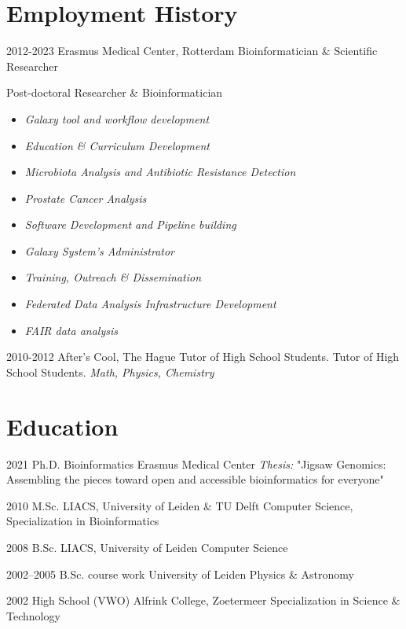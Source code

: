 \documentclass[]{shiltemann-cv}
\begin{document}
\section{Employment History}

\begin{entrylist}
 \entry
    {2012-2023}
    {Erasmus Medical Center, Rotterdam}
    {Bioinformatician \& Scientific Researcher}
    {Post-doctoral Researcher \& Bioinformatician
     \begin{itemize}
       \item \emph{Galaxy tool and workflow development}
       \item \emph{Education \& Curriculum Development}
       \item \emph{Microbiota Analysis and Antibiotic Resistance Detection}
       \item \emph{Prostate Cancer Analysis}
       \item \emph{Software Development and Pipeline building}
       \item \emph{Galaxy System's Administrator}
       \item \emph{Training, Outreach \& Dissemination}
       \item \emph{Federated Data Analysis Infrastructure Development}
       \item \emph{FAIR data analysis}
     \end{itemize}}
  \entry
    {2010-2012}
    {After's Cool, The Hague}
    {Tutor of High School Students.}
    {Tutor of High School Students. \emph{Math, Physics, Chemistry}}
\end{entrylist}


\section{Education}

\begin{entrylist}
  \entry
    {2021}
    {Ph.D. Bioinformatics}
    {Erasmus Medical Center}
    {\emph{Thesis:} "Jigsaw Genomics: Assembling the pieces toward open and accessible bioinformatics for everyone"}
\end{entrylist}
\begin{entrylist}


  \entry
    {2010}
    {M.Sc.}
    {LIACS, University of Leiden \& TU Delft}
    {Computer Science, Specialization in Bioinformatics}

\end{entrylist}
\begin{entrylist}

  \entry
    {2008}
    {B.Sc.}
    {LIACS, University of Leiden}
    {Computer Science}
\end{entrylist}
\begin{entrylist}


  \entry
    {2002–2005}
    {B.Sc. course work}
    {University of Leiden}
    {Physics \& Astronomy}
\end{entrylist}
\begin{entrylist}


  \entry
    {2002}
    {High School (VWO)}
    {Alfrink College, Zoetermeer}
    {Specialization in Science \& Technology}
\end{entrylist}
\end{document}
